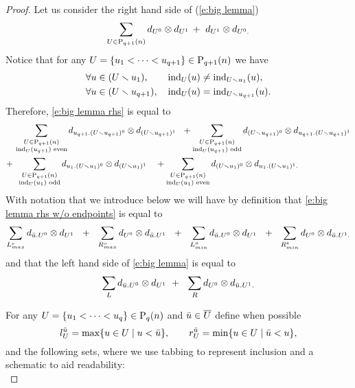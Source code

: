 \begin{proof}
	Let us consider the right hand side of (\cref{e:big lemma})
	\begin{equation} \label{e:big lemma rhs}
	\sum_{U \in \P_{q+1}(n)} d_{U^0} \otimes d_{U^1}\, +\ d_{U^1} \otimes d_{U^0.}
	\end{equation}
	Notice that for any $U = \{u_1 < \cdots < u_{q+1}\} \in \P_{q+1}(n)$ we have
	\begin{align*}
	& \forall u \in (U \sm u_1), \qquad \ind_{U}(u) \neq \ind_{U \sm u_1}(u), \\
	& \forall u \in (U \sm u_{q+1}), \quad \ind_{U}(u) = \ind_{U \sm u_{q+1}}(u).
	\end{align*}
	Therefore, \eqref{e:big lemma rhs} is equal to
	\begin{equation} \label{e:big lemma rhs w/o endpoints}
	\begin{split}
	&\, \sum_{\substack{U \in \P_{q+1}(n) \\ \ind_U(u_{q+1}) \text{ even}}}
	d_{u_{q+1}.(U \sm u_{q+1})^0} \otimes d_{(U \sm u_{q+1})^1}\ \ + 
	\sum_{\substack{U \in \P_{q+1}(n) \\ \ind_U(u_{q+1}) \text{ odd}}}
	d_{(U \sm u_{q+1})^0} \otimes d_{u_{q+1}.(U \sm u_{q+1})^1} \\ +
	&\ \,\sum_{\substack{U \in \P_{q+1}(n) \\ \ind_U(u_1) \text{ odd}}} d_{u_1.(U \sm u_1)^0} \otimes d_{(U\sm u_1)^1} \quad +
	\sum_{\substack{U \in \P_{q+1}(n) \\ \ind_U(u_1) \text{ even}}} d_{(U \sm u_1)^0} \otimes d_{u_1.(U\sm u_1)^1.}
	\end{split}
	\end{equation}
	With notation that we introduce below we will have by definition that \eqref{e:big lemma rhs w/o endpoints} is equal to
	\begin{equation} \label{e:big lemma rhs promising} 
	\sum_{{L}_{max}^{e}} d_{\bu.U^0} \otimes d_{U^1}\ \ +\ \ 
	\sum_{{R}_{max}^{o}} d_{U^0} \otimes d_{\bu.U^1}\ \ +\ \ 
	\sum_{{L}_{min}^{o}} d_{\bu.U^0} \otimes d_{U^1}\ \ +\ \ 
	\sum_{{R}_{min}^{e}} d_{U^0} \otimes d_{\bu.U^1.}
	\end{equation}
	and that the left hand side of \eqref{e:big lemma} is equal to
	\begin{equation} \label{e:big lemma lhs}
	\sum_{L} d_{\bu.U^0} \otimes d_{U^1}\ +\ \ 
	\sum_{R} d_{U^0} \otimes d_{\bu.U^1.}
	\end{equation}
	
	For any $U = \{u_1 < \cdots < u_q\} \in \P_{q}(n)$ and $\bu \in \overline{U}$ define when possible
	\begin{equation*}
	l_U^\bu = \max \{u \in U \mid u < \bu\}, \qquad
	r_U^\bu = \min\{u \in U \mid \bu < u\},
	\end{equation*}
	and the following sets, where we use tabbing to represent inclusion and a schematic to aid readability:\\
	

\end{proof}
